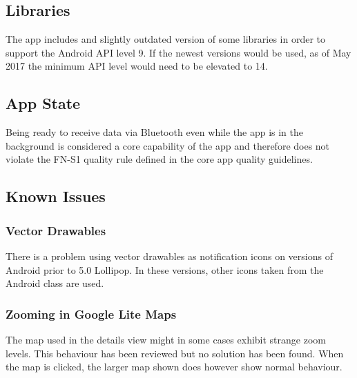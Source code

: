 \subsection{Libraries}
The app includes and slightly outdated version of some libraries in order to support the Android API level 9. If the newest versions would be used, as of May 2017 the minimum API level would need to be elevated to 14.

\subsection{App State}
Being ready to receive data via Bluetooth even while the app is in the background is considered a core capability of the app and therefore does not violate the FN-S1 quality rule defined in the core app quality guidelines.

\subsection{Known Issues}
\subsubsection{Vector Drawables}
There is a problem using vector drawables as notification icons on versions of Android prior to 5.0 Lollipop. In these versions, other icons taken from the Android class are used.

\subsubsection{Zooming in Google Lite Maps}
The map used in the details view might in some cases exhibit strange zoom levels. This behaviour has been reviewed but no solution has been found. When the map is clicked, the larger map shown does however show normal behaviour.

